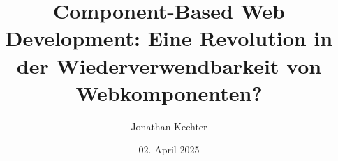 \documentclass[oneside]{ausarbeitung}
\begin{document}


\Bachelorarbeit

\Informatik
\title{Component-Based Web Development: Eine Revolution in der Wiederverwendbarkeit von Webkomponenten?}

\author{Jonathan Kechter}

\examinerIsAProfessortrue   %


\date{02. April 2025}





\maketitle
\cleardoublepage

\setcounter{page}{1}

\cleardoublepage

\makeaffirmation
\cleardoublepage

\cleardoublepage
\end{document}

